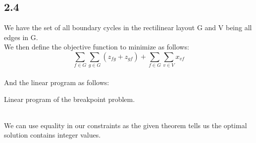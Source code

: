 \subsection*{2.4}

We have the set of all boundary cycles in the rectilinear layout G and V being all edges in G.\\
We then define the objective function to minimize as follows:
\begin{equation}
    \sum_{f \in G}\sum_{g \in G} (z_{fg} + z_{gf}) + \sum_{f \in G}\sum_{v \in V} x_{vf}
\end{equation}\\
And the linear program as follows:
\begin{table}[!ht]
    \caption{Linear program of the breakpoint problem.}
\end{table}\\
We can use equality in our constraints as the given theorem tells us the optimal solution contains integer values.
